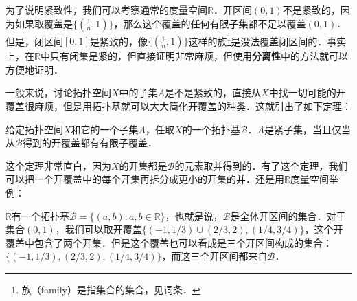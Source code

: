 为了说明紧致性，我们可以考察通常的度量空间$\mathbb{R}$．开区间$(0,1)$不是紧致的，因为如果取覆盖是$\{(\frac{1}{n}, 1)\}$，那么这个覆盖的任何有限子集都不足以覆盖$(0, 1)$．但是，闭区间$[0,1]$是紧致的，像$\{(\frac{1}{n}, 1)\}$这样的族\footnote{族（family）是指集合的集合，见词条．}是没法覆盖闭区间的．事实上，在$\mathbb{R}$中只有闭集是紧的，但直接证明非常麻烦，但使用\textbf{分离性}中的方法就可以方便地证明．

一般来说，讨论拓扑空间$X$中的子集$A$是不是紧致的，直接从$X$中找一切可能的开覆盖很麻烦，但是用拓扑基就可以大大简化开覆盖的种类．这就引出了如下定理：

\begin{theorem}{}\label{Topo2_the1}
给定拓扑空间$X$和它的一个子集$A$，任取$X$的一个拓扑基$\mathcal{B}$．$A$是紧子集，当且仅当从$\mathcal{B}$得到的开覆盖都有有限子覆盖．
\end{theorem}

这个定理非常直白，因为$X$的开集都是$\mathcal{B}$的元素取并得到的．有了这个定理，我们可以把一个开覆盖中的每个开集再拆分成更小的开集的并．还是用$\mathbb{R}$度量空间举例：

\begin{example}{}\label{Topo2_ex1}
$\mathbb{R}$有一个拓扑基$\mathcal{B}=\{(a,b):a,b\in \mathbb{R}\}$，也就是说，$\mathcal{B}$是全体开区间的集合．对于集合$(0,1)$，我们可以取开覆盖$\{(-1,1/3)\cup(2/3,2), (1/4, 3/4)\}$，这个开覆盖中包含了两个开集．但是这个覆盖也可以看成是三个开区间构成的集合：$\{(-1,1/3), (2/3,2), (1/4, 3/4)\}$，而这三个开区间都来自$\mathcal{B}$．

\end{example}